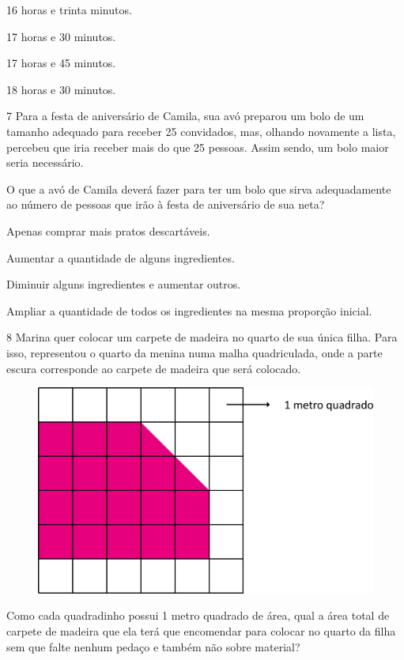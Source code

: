 \begin{escolha}
\item
  16 horas e trinta minutos.
\item
  17 horas e 30 minutos.
\item
  17 horas e 45 minutos.
\item
  18 horas e 30 minutos.
\end{escolha}

\pagebreak
\num{7} Para a festa de aniversário de Camila, sua avó preparou um bolo de um tamanho adequado para receber 25 convidados, mas, olhando novamente a lista, percebeu que iria receber mais do que 25 pessoas. Assim sendo, um bolo maior seria necessário.

O que a avó de Camila deverá fazer para ter um bolo que sirva adequadamente ao número de pessoas que irão à festa de aniversário de sua neta?

\begin{escolha}
\item
  Apenas comprar mais pratos descartáveis.
\item
  Aumentar a quantidade de alguns ingredientes.
\item
  Diminuir alguns ingredientes e aumentar outros.
\item
  Ampliar a quantidade de todos os ingredientes na mesma proporção inicial.
\end{escolha}


\num{8} Marina quer colocar um carpete de madeira no quarto de sua única filha.
Para isso, representou o quarto da menina numa malha quadriculada, onde a parte escura corresponde ao carpete de madeira que será
colocado.

\begin{figure}[htpb!]
\centering
\includegraphics[width=.5\textwidth]{./media/image108.png}
\end{figure}

Como cada quadradinho possui 1 metro quadrado de área, qual a área total de carpete de madeira que ela terá que encomendar para colocar no quarto da filha sem que falte nenhum pedaço e também não sobre material?

